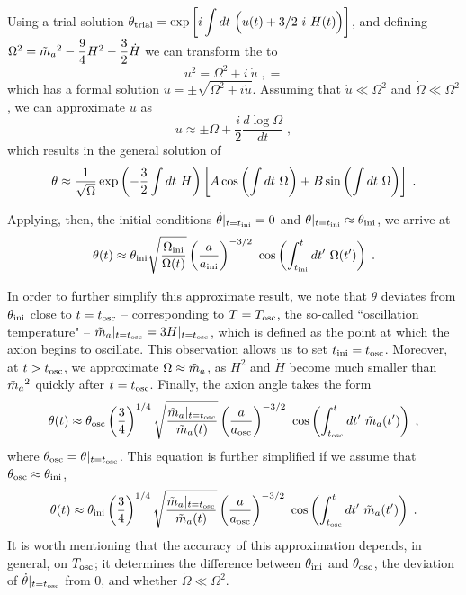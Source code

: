 \documentclass[11pt,a4paper]{article}
\begin{document}
Using a trial solution $\theta_{\rm trial} = \exp\left[  i \displaystyle \int d t \ \Big( u(t) +3/2 \ i \ H(t) \Big)  \right]$, and defining $\Omega^2 = \tilde m_{a}{}^2 - \dfrac{9}{4} H^2 -  \dfrac{3}{2} \dot H $ we can transform the  to 
%
\begin{equation}
	u^2 = \Omega^2 + i \ \dot u \; ,
	\label{eq:eom_of_u}=
\end{equation}
%
which has a formal solution $u = \pm \sqrt{\Omega^2 + i \dot u}$. Assuming that $\dot u \ll \Omega^2$ and $\dot \Omega \ll \Omega^2$, we can approximate $u$ as
%
\begin{equation}
	u \approx \pm \Omega + \dfrac{i}{2} \dfrac{d \log \Omega}{d t} \;,
	\label{eq:u_approx}
\end{equation}
%
which results in the general solution of  
%
\begin{equation}
	\theta \approx \dfrac{1}{\sqrt{\Omega}} \exp\left( -\dfrac{3}{2} \int d t \ H \right) \left[  A \cos\left(  \int d t \ \Omega \right) +  B \sin\left(  \int d t \ \Omega \right)     \right] \;. 
	\label{eq:general_solution_eom_approx}
\end{equation}

Applying, then, the initial conditions $ \dot \theta |_{t=t_{\rm ini}{}} = 0$ and  $\theta|_{t=t_{\rm ini}{}} \approx \theta_{\rm ini}{}$, we arrive at 
%
\begin{equation}
\theta(t) \approx \theta_{\rm ini}{} \sqrt{ \dfrac{ \Omega_{\rm ini} }{\Omega (t)} } \left( \dfrac{a}{a_{\rm ini}{}} \right)^{-3/2} \  \cos\left(  \int_{t_{\rm ini}{}}^t d t^\prime  \ \Omega(t^\prime) \right)   \;.
\label{eq:solution_eom_approx} 
\end{equation}


In order to further simplify this approximate result, we note that $\theta$ deviates from $\theta_{\rm ini}{}$ close to $t=t_{\rm osc}{}$ -- corresponding to $T = T_{\rm osc}{}$, the so-called ``oscillation temperature" -- $\tilde m_{a}{}|_{t = t_{\rm osc}{}} = 3 H|_{t = t_{\rm osc}{}}$, which is defined as the point at which the axion begins to oscillate. 
%
This observation allows us to set $t_{\rm ini}{} = t_{\rm osc}{}$.  Moreover, at $t > t_{\rm osc}{}$, we approximate $\Omega \approx \tilde m_{a}{}$, as $H^2$ and $\dot H$ become much smaller than $\tilde m_{a}{}^2$ quickly after $t=t_{\rm osc}{}$. Finally, the axion angle takes the form
%
\begin{equation}
	\theta(t) \approx \theta_{\rm osc}{} \left( \dfrac{3}{4} \right)^{1/4} \sqrt{ \dfrac{ \tilde m_{a}{}|_{t=t_{\rm osc}{}} }{\tilde m_{a}{}  (t)} } \left( \dfrac{a}{a_{\rm osc}{}} \right)^{-3/2} \  \cos\left(  \int_{t_{\rm osc}{}}^t d t^\prime  \ \tilde m_{a}{}(t^\prime) \right)   \;,
	\label{eq:solution_eom_approx_theta_osc} 
\end{equation}
%
where $\theta_{\rm osc}{} = \theta|_{t=t_{\rm osc}{}}$. This equation is further simplified if we assume that $\theta_{\rm osc}{} \approx \theta_{\rm ini}{}$, \ie
%
\begin{equation}
	\theta(t) \approx \thetai \lrb{\dfrac{3}{4}}^{1/4} \sqrt{ \dfrac{ \maT|_{t=\tosc} }{\maT  (t)} } \lrb{\dfrac{a}{\aosc}}^{-3/2} \  \cos\lrb{ \int_{\tosc}^t d t^\prime  \ \maT(t^\prime)}   \;.
	\label{eq:solution_eom_approx_final} 
\end{equation}
%
It is worth mentioning that the accuracy of this approximation depends, in general, on $T_{\rm osc}{}$; it determines the difference between $\theta_{\rm ini}{}$ and $\theta_{\rm osc}{}$, the deviation of $\dot \theta|_{t=t_{\rm osc}{}}$ from $0$, and whether $\dot \Omega \ll \Omega^2$. 
\end{document}
